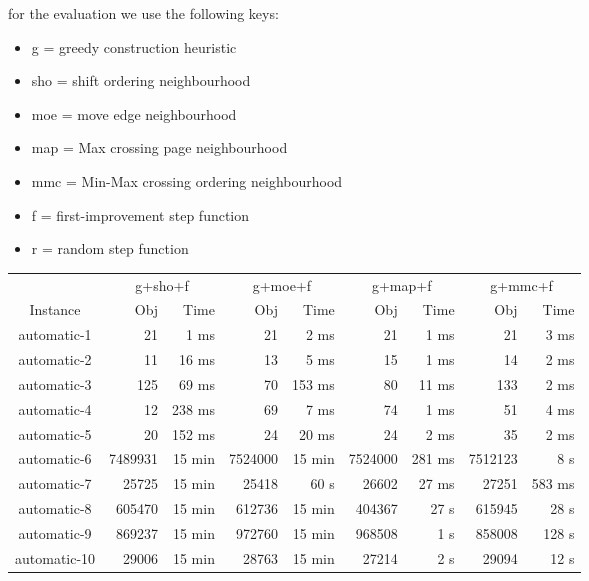 \documentclass[11pt]{article}
\begin{document}
{
for the evaluation we use the following keys:
\begin{itemize}
	\item g = greedy construction heuristic
	\item sho = shift ordering neighbourhood
	\item moe = move edge neighbourhood
	\item map = Max crossing page neighbourhood
	\item mmc = Min-Max crossing ordering neighbourhood 
	\item f = first-improvement step function
	\item r = random step function
\end{itemize}
\center
\begin{tabular}{c|rr|rr|rr|rr}
	     & \multicolumn{2}{c}{g+sho+f} & \multicolumn{2}{c}{g+moe+f} & \multicolumn{2}{c}{g+map+f} & \multicolumn{2}{c}{g+mmc+f} \\
Instance     & Obj     & Time              & Obj          & Time         & Obj          & Time         & Obj        & Time            \\
\hline
automatic-1  & 21      & 1 ms         & 21           & 2 ms    &  21          & 1 ms   & 21         & 3 ms               \\
automatic-2  & 11      & 16 ms         & 13           & 5 ms    &  15          & 1 ms              & 14         & 2 ms                 \\
automatic-3  & 125     & 69 ms         & 70           & 153 ms    &  80          & 11 ms              & 133        & 2 ms                \\
automatic-4  & 12      & 238 ms            & 69           & 7 ms    &  74          & 1 ms              & 51         & 4 ms                 \\
automatic-5  & 20      & 152 ms           & 24           & 20 ms       &  24          & 2 ms              & 35         & 2 ms                \\
automatic-6  & 7489931 & 15 min & 7524000      & 15 min       &  7524000     & 281 ms              & 7512123    & 8 s                \\
automatic-7  & 25725   & 15 min & 25418        & 60 s &  26602       & 27 ms    & 27251      & 583 ms                \\
automatic-8  & 605470  & 15 min & 612736       & 15 min       &  404367      & 27 s            & 615945     & 28 s                \\
automatic-9  & 869237  & 15 min & 972760       & 15 min       &  968508      & 1 s              & 858008     &  128 s               \\
automatic-10 & 29006   & 15 min & 28763        & 15 min       &  27214       & 2 s             & 29094      & 12 s                \\
\end{tabular}
}
\end{document}
